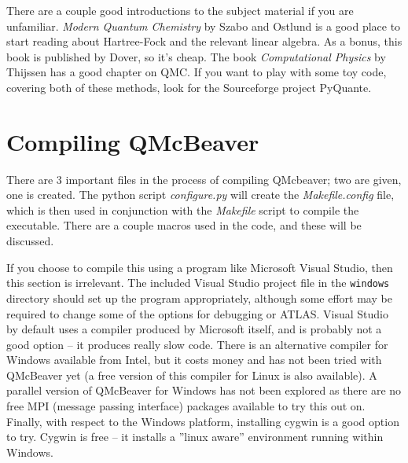 \documentclass[11pt]{article}
\begin{document}
There are a couple good introductions to the subject material if you are unfamiliar.
\emph{Modern Quantum Chemistry} by Szabo and Ostlund\cite{Szabo82} is a good place to start
reading about Hartree-Fock and the relevant linear algebra. As a bonus, this book is published by Dover, so it's cheap.
The book \emph{Computational Physics} by Thijssen\cite{Thijssen99} has a good chapter on QMC. If you want to
play with some toy code, covering both of these methods, look for the Sourceforge project PyQuante.

\section{Compiling QMcBeaver}
There are 3 important files in the process of compiling QMcbeaver; two are given, one is created. The python script
\emph{configure.py} will create the \emph{Makefile.config} file, which is then used in conjunction with the \emph{Makefile} script to compile the executable. There are a couple macros used in the code, and these will be discussed.

If you choose to compile this using a program like Microsoft Visual Studio, then this section is irrelevant. The included Visual Studio project file in the {\tt windows} directory should set up the program appropriately, although some effort may be required to change some of the options for debugging or ATLAS. Visual Studio by default uses a compiler produced by Microsoft itself, and is probably not a good option -- it produces really slow code. There is an alternative compiler for Windows available from Intel, but it costs money and has not been tried with QMcBeaver yet (a free version of this compiler for Linux is also available). A parallel version of QMcBeaver for Windows has not been explored as there are no free MPI (message passing interface) packages available to try this out on. Finally, with respect to the Windows platform, installing cygwin is a good option to try. Cygwin is free -- it installs a ''linux aware'' environment running within Windows.
\end{document}
